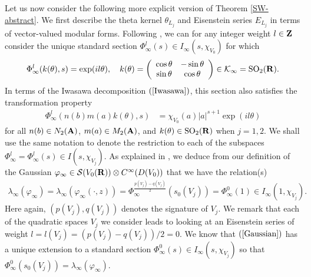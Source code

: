 \documentclass{amsart}
\theoremstyle{definition}
\begin{document}
Let us now consider the following more explicit version of Theorem \ref{SW-abstract}. 
We first describe the theta kernel $\theta_{L_j}$ and Eisenstein series $E_{L_j}$ in terms of vector-valued modular forms. 
Following \cite[$\S$ 2.1]{BY}, we can for any integer weight $l \in {\bf{Z}}$ consider the
unique standard section $\Phi_{\infty}^l(s) \in I_{\infty}(s, \chi_{V_0})$ for which 
\begin{align}\label{IDC} \Phi_{\infty}^l( k(\theta), s) = \exp(i l \theta), \quad 
k(\theta) = \left( \begin{array}{cc} \cos \theta & -\sin \theta \\ \sin \theta & \cos \theta \end{array} \right) 
\in \mathcal{K}_{\infty} = \operatorname{SO}_2( {\bf{R}}). \end{align}
In terms of the Iwasawa decomposition $(\ref{Iwasawa})$, this section also satisfies the transformation property 
\begin{align}\label{Iw} \Phi_{\infty}^l( n(b) m(a) k(\theta), s) &= \chi_{V_0}(a) \vert a \vert^{s+1} \exp(i l \theta)  \end{align} 
for all $n(b) \in N_2({\bf{A}})$, $m(a) \in M_2({\bf{A}})$, and $k(\theta) \in \operatorname{SO}_2({\bf{R}})$ when $j=1,2$. 
We shall use the same notation to denote the restriction to each of the subspaces $\Phi_{\infty}^l = \Phi_{\infty}^l(s) \in I(s, \chi_{V_j})$.
As explained in \cite[(2.15)]{BY}, we deduce from our definition of the Gaussian  
$\varphi_{\infty} \in \mathcal{S}(V_0({\bf{R}})) \otimes C^{\infty}( D(V_0))$ that we have the relation(s)
\begin{align}\label{Gaussian} \lambda_{\infty}(\varphi_{\infty}) = \lambda_{\infty}(\varphi_{\infty}(\cdot, z)) 
= \Phi_{\infty}^{ \frac{ p(V_j) - q(V_j) }{2} }(s_0(V_j)) = \Phi_{\infty}^0(1) \in I_{\infty}(1, \chi_{V_j}). \end{align}
Here again, $(p(V_j), q(V_j))$ denotes the signature of $V_j$. 
We remark that each of the quadratic spaces $V_j$ we consider  
leads to looking at an Eisenstein series of weight $l = l(V_j) = (p(V_j) - q(V_j))/2 = 0$.
We know that $(\ref{Gaussian})$ has a unique extension to a standard section 
$\Phi_{\infty}^0(s) \in I_{\infty}(s, \chi_{V_j})$ so that $\Phi_{\infty}^0(s_0(V_j)) = \lambda_{\infty}(\varphi_{\infty})$. 
\end{document}
